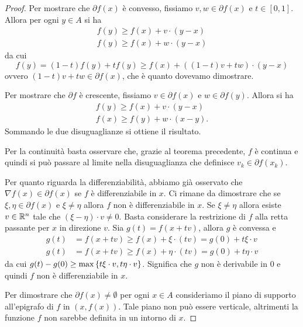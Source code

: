 \begin{proof}
  Per mostrare che $\partial f(x)$ è convesso, fissiamo $v,w \in \partial f(x)$ e $t\in [0,1]$.
  Allora per ogni $y\in A$ si ha 
  \begin{align*}
    f(y) \ge f(x) + v\cdot (y-x) \\
    f(y) \ge f(x) + w\cdot (y-x)
  \end{align*}
  da cui
  \[
    f(y) = (1-t) f(y) + t f(y) 
      \ge f(x) + ((1-t)v + t w)\cdot (y-x)
  \]
  ovvero $(1-t)v + t w \in \partial f(x)$, 
  che è quanto dovevamo dimostrare.

  Per mostrare che $\partial f$ è crescente, fissiamo $v\in \partial f(x)$ e $w\in \partial f(y)$.
  Allora si ha 
  \begin{align*}
    f(y) \ge f(x) + v\cdot (y-x) \\
    f(x) \ge f(y) + w\cdot (x-y).
  \end{align*}
  Sommando le due disuguaglianze si ottiene il risultato.

  Per la continuità basta osservare che, grazie al teorema 
  precedente, $f$ è continua e quindi si può passare al limite 
  nella disuguaglianza che definisce $v_k\in \partial f(x_k)$.

  Per quanto riguarda la differenziabilità, abbiamo già osservato 
  che $\nabla f(x) \in \partial f(x)$ se $f$ è differenziabile in $x$.
  Ci rimane da dimostrare che se $\xi,\eta\in \partial f(x)$ 
  e $\xi\neq\eta$ allora $f$ non è differenziabile in $x$.
  Se $\xi\neq\eta$ allora esiste $v\in {\mathbb R}^n$ 
  tale che $(\xi-\eta)\cdot v \neq 0$.
  Basta considerare la restrizione di $f$ alla retta passante per $x$ in direzione $v$.
  Sia $g(t) = f(x+t v)$, allora $g$ è convessa e
  \begin{align*}
   g(t) &= f(x+tv) \ge f(x) + \xi\cdot (tv) = g(0) + t \xi\cdot v\\
   g(t) &= f(x+tv) \ge f(x) + \eta\cdot (tv) = g(0) + t \eta\cdot v
  \end{align*}
  da cui $g(t) - g(0) \ge \max{\left\{ t \xi\cdot v, t \eta\cdot v \right\}}$.
  Significa che $g$ non è derivabile in $0$ e quindi $f$ non è differenziabile in $x$.

  Per dimostrare che $\partial f(x) \neq \emptyset$ per ogni $x\in A$
  consideriamo il piano di supporto all'epigrafo di $f$ in $(x,f(x))$.
  Tale piano non può essere verticale, altrimenti 
  la funzione $f$ non sarebbe definita in un intorno di $x$.
  \end{proof}


